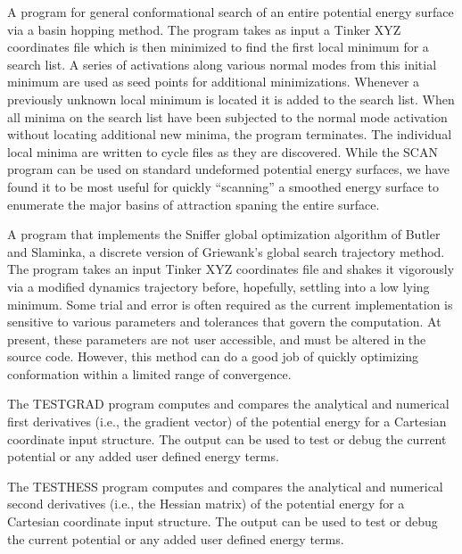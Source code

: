 \documentclass[letterpaper,11pt,english]{sphinxmanual}
\begin{document}

A program for general conformational search of an entire potential energy surface via a basin hopping method. The program takes as input a Tinker XYZ coordinates file which is then minimized to find the first local minimum for a search list. A series of activations along various normal modes from this initial minimum are used as seed points for additional minimizations. Whenever a previously unknown local minimum is located it is added to the search list. When all minima on the search list have been subjected to the normal mode activation without locating additional new minima, the program terminates. The individual local minima are written to cycle files as they are discovered. While the SCAN program can be used on standard undeformed potential energy surfaces, we have found it to be most useful for quickly “scanning” a smoothed energy surface to enumerate the major basins of attraction spaning the entire surface.


A program that implements the Sniffer global optimization algorithm of Butler and Slaminka, a discrete version of Griewank’s global search trajectory method. The program takes an input Tinker XYZ coordinates file and shakes it vigorously via a modified dynamics trajectory before, hopefully, settling into a low lying minimum. Some trial and error is often required as the current implementation is sensitive to various parameters and tolerances that govern the computation. At present, these parameters are not user accessible, and must be altered in the source code. However, this method can do a good job of quickly optimizing conformation within a limited range of convergence.


The TESTGRAD program computes and compares the analytical and numerical first derivatives (i.e., the gradient vector) of the potential energy for a Cartesian coordinate input structure. The output can be used to test or debug the current potential or any added user defined energy terms.


The TESTHESS program computes and compares the analytical and numerical second derivatives (i.e., the Hessian matrix) of the potential energy for a Cartesian coordinate input structure. The output can be used to test or debug the current potential or any added user defined energy terms.
\end{document}
